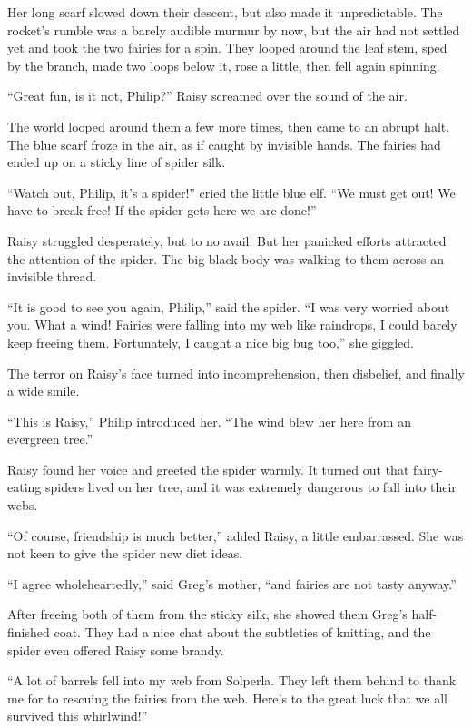 \documentclass[10pt, draft]{memoir}
\begin{document}
Her long scarf slowed down their descent, but also made it unpredictable. The
rocket's rumble was a barely audible murmur by now, but the air had not settled
yet and took the two fairies for a spin. They looped around the leaf stem, sped
by the branch, made two loops below it, rose a little, then fell again
spinning.

``Great fun, is it not, Philip?'' Raisy screamed over the sound of the air.

The world looped around them a few more times, then came to an abrupt halt. The
blue scarf froze in the air, as if caught by invisible hands. The fairies had
ended up on a sticky line of spider silk.

``Watch out, Philip, it's a spider!'' cried the little blue elf. ``We must get
out! We have to break free! If the spider gets here we are done!''

Raisy struggled desperately, but to no avail. But her panicked efforts
attracted the attention of the spider. The big black body was walking to them
across an invisible thread.

``It is good to see you again, Philip,'' said the spider. ``I was very worried
about you. What a wind! Fairies were falling into my web like raindrops, I
could barely keep freeing them. Fortunately, I caught a nice big bug too,'' she
giggled.

The terror on Raisy's face turned into incomprehension, then disbelief, and
finally a wide smile.

``This is Raisy,'' Philip introduced her. ``The wind blew her here from an
evergreen tree.''

Raisy found her voice and greeted the spider warmly. It turned out that
fairy-eating spiders lived on her tree, and it was extremely dangerous to fall
into their webs.

``Of course, friendship is much better,'' added Raisy, a little embarrassed.
She was not keen to give the spider new diet ideas.

``I agree wholeheartedly,'' said Greg's mother, ``and fairies are not tasty
anyway.''

After freeing both of them from the sticky silk, she showed them Greg's
half-finished coat. They had a nice chat about the subtleties of knitting, and
the spider even offered Raisy some brandy.

``A lot of barrels fell into my web from Solperla. They left them behind to
thank me for to rescuing the fairies from the web. Here's to the great luck
that we all survived this whirlwind!''
\end{document}
